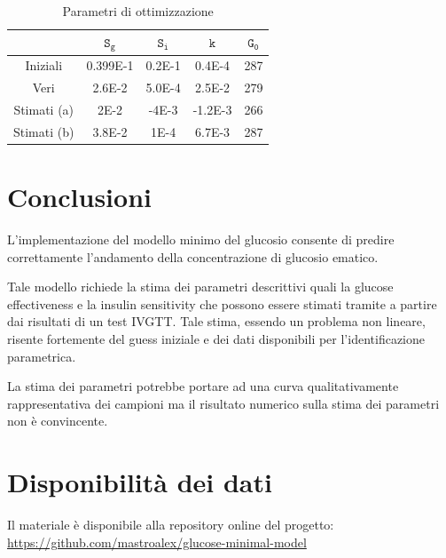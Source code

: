\begin{table}[t!]
	\small{\begin{tabular}{|c|c|c|c|c|}
		\hline
		&  $\mathtt{S_g}$ & $\mathtt{S_i}$ &$\mathtt{k}$  &$\mathtt{G_0}$ \\
		\hline
		Iniziali & 0.399E-1 & 0.2E-1 & 0.4E-4 & 287   \\
		\hline
		Veri &2.6E-2  &5.0E-4 & 2.5E-2 &279  \\
		\hline
		Stimati (a) & 2E-2  &-4E-3  &-1.2E-3  &266  \\
		\hline
		Stimati (b) & 3.8E-2  &1E-4  &6.7E-3  &287  \\
				\hline
	\end{tabular}}
	\caption{Parametri di ottimizzazione}
	\label{tab:optim}
\end{table}



\section{Conclusioni}

L'implementazione del modello minimo del glucosio consente di predire correttamente l'andamento della concentrazione di glucosio ematico. 

Tale modello richiede la stima dei parametri descrittivi quali la glucose effectiveness e la insulin sensitivity che possono essere stimati tramite a partire dai risultati di un test IVGTT. Tale stima, essendo un problema non lineare, risente fortemente del guess iniziale e dei dati disponibili per l'identificazione parametrica.

La stima dei parametri potrebbe portare ad una curva qualitativamente rappresentativa dei campioni ma il risultato numerico sulla stima dei parametri non è convincente.


\raggedbottom
\section*{Disponibilità dei dati}

Il materiale è disponibile alla repository online del progetto: \url{https://github.com/mastroalex/glucose-minimal-model}


\raggedbottom
\printbibliography[title=Riferimenti]


